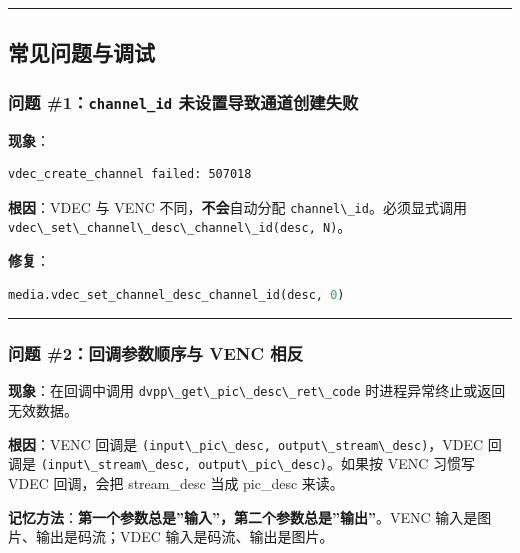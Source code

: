 \begin{center}\rule{0.5\linewidth}{0.5pt}\end{center}

\subsection{常见问题与调试}\label{src-book-chapter6-h68}

\subsubsection{\texorpdfstring{问题 \#1：\texttt{channel\_id}
未设置导致通道创建失败}{问题 \#1：channel\_id 未设置导致通道创建失败}}\label{src-book-chapter6-h69}

\textbf{现象}：

\begin{lstlisting}
vdec_create_channel failed: 507018
\end{lstlisting}

\textbf{根因}：VDEC 与 VENC 不同，\textbf{不会}自动分配
\passthrough{\lstinline!channel\_id!}。必须显式调用
\passthrough{\lstinline!vdec\_set\_channel\_desc\_channel\_id(desc, N)!}。

\textbf{修复}：

\begin{lstlisting}[language=Python]
media.vdec_set_channel_desc_channel_id(desc, 0)
\end{lstlisting}

\begin{center}\rule{0.5\linewidth}{0.5pt}\end{center}

\subsubsection{问题 \#2：回调参数顺序与 VENC
相反}\label{src-book-chapter6-h70}

\textbf{现象}：在回调中调用
\passthrough{\lstinline!dvpp\_get\_pic\_desc\_ret\_code!}
时进程异常终止或返回无效数据。

\textbf{根因}：VENC 回调是
\passthrough{\lstinline!(input\_pic\_desc, output\_stream\_desc)!}，VDEC
回调是
\passthrough{\lstinline!(input\_stream\_desc, output\_pic\_desc)!}。如果按
VENC 习惯写 VDEC 回调，会把 stream\_desc 当成 pic\_desc 来读。

\textbf{记忆方法}：\textbf{第一个参数总是''输入''，第二个参数总是''输出''}。VENC
输入是图片、输出是码流；VDEC 输入是码流、输出是图片。

